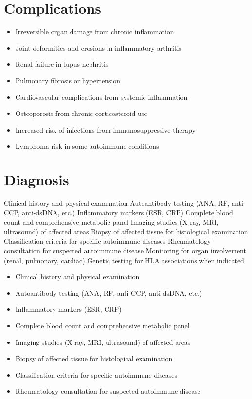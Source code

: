 \section{Complications}
\begin{itemize}[noitemsep]
  \item Irreversible organ damage from chronic inflammation
  \item Joint deformities and erosions in inflammatory arthritis
  \item Renal failure in lupus nephritis
  \item Pulmonary fibrosis or hypertension
  \item Cardiovascular complications from systemic inflammation
  \item Osteoporosis from chronic corticosteroid use
  \item Increased risk of infections from immunosuppressive therapy
  \item Lymphoma risk in some autoimmune conditions
\end{itemize}
\section{Diagnosis}
Clinical history and physical examination Autoantibody testing (ANA, RF, anti-CCP, anti-dsDNA, etc.) Inflammatory markers (ESR, CRP) Complete blood count and comprehensive metabolic panel Imaging studies (X-ray, MRI, ultrasound) of affected areas Biopsy of affected tissue for histological examination Classification criteria for specific autoimmune diseases Rheumatology consultation for suspected autoimmune disease Monitoring for organ involvement (renal, pulmonary, cardiac) Genetic testing for HLA associations when indicated

\begin{itemize}[noitemsep]
  \item Clinical history and physical examination
  \item Autoantibody testing (ANA, RF, anti-CCP, anti-dsDNA, etc.)
  \item Inflammatory markers (ESR, CRP)
  \item Complete blood count and comprehensive metabolic panel
  \item Imaging studies (X-ray, MRI, ultrasound) of affected areas
  \item Biopsy of affected tissue for histological examination
  \item Classification criteria for specific autoimmune diseases
  \item Rheumatology consultation for suspected autoimmune disease
\end{itemize}
